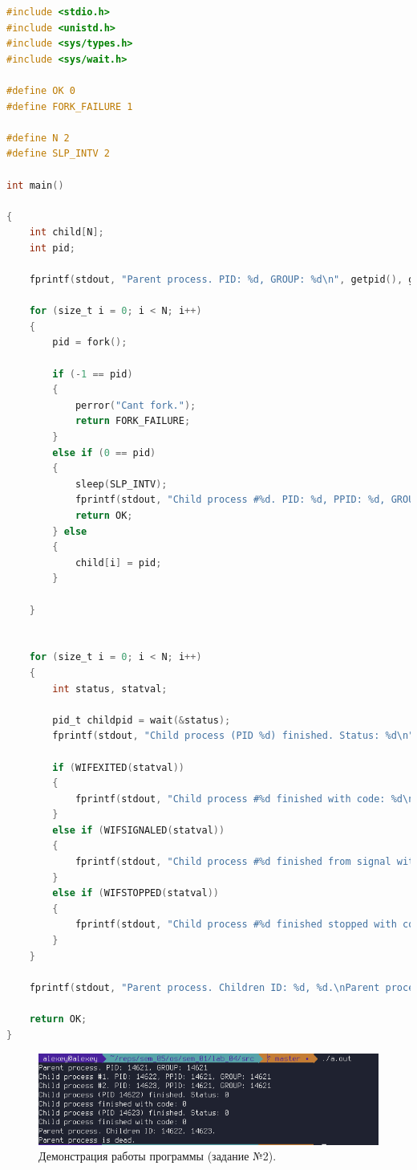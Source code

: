 \documentclass[12pt]{report}
\begin{document}
\begin{lstlisting}[label=some-code,caption=Вызов функции wait(),language=C]
#include <stdio.h>
#include <unistd.h>
#include <sys/types.h>
#include <sys/wait.h>

#define OK 0
#define FORK_FAILURE 1

#define N 2
#define SLP_INTV 2

int main()

{
	int child[N];
	int pid;
	
	fprintf(stdout, "Parent process. PID: %d, GROUP: %d\n", getpid(), getpgrp());
	
	for (size_t i = 0; i < N; i++)
	{
		pid = fork();
		
		if (-1 == pid)
		{
			perror("Cant fork.");
			return FORK_FAILURE;
		}
		else if (0 == pid)
		{
			sleep(SLP_INTV);
			fprintf(stdout, "Child process #%d. PID: %d, PPID: %d, GROUP: %d\n", i + 1, getpid(), getppid(), getpgrp());
			return OK;
		} else
		{
			child[i] = pid;
		}

	}

	
	for (size_t i = 0; i < N; i++)
	{
		int status, statval;
		
		pid_t childpid = wait(&status);
		fprintf(stdout, "Child process (PID %d) finished. Status: %d\n", childpid, status);
		
		if (WIFEXITED(statval))
		{
			fprintf(stdout, "Child process #%d finished with code: %d\n", i + 1, WEXITSTATUS(statval));
		}
		else if (WIFSIGNALED(statval))
		{
			fprintf(stdout, "Child process #%d finished from signal with code: %d\n", i + 1, WTERMSIG(statval));
		}
		else if (WIFSTOPPED(statval))
		{
			fprintf(stdout, "Child process #%d finished stopped with code: %d\n", i + 1, WSTOPSIG(statval));
		}
	}
	
	fprintf(stdout, "Parent process. Children ID: %d, %d.\nParent process is dead.\n", child[0], child[1]);
	
	return OK;
}
\end{lstlisting}

\begin{figure}[H]

	\centering

	\includegraphics[width=\linewidth]{img/task02.png}
	\caption{Демонстрация работы программы (задание №2).}

	\label{fig:task02}

\end{figure}
\end{document}
